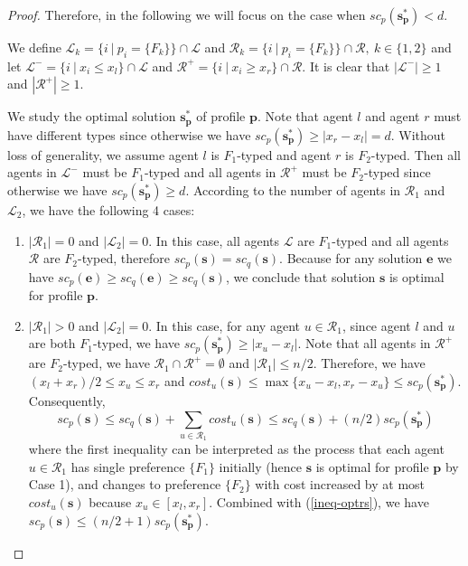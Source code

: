 \documentclass[twoside,11pt]{article}
\newcommand{\bd}{\mathbf}
\begin{document}
\begin{proof}
Therefore, in the following we will focus on the case when $sc_p (\bd{s_p^*}) < d$.

We define $\mathcal{L}_k = \{i~|~p_i = \{F_k\}\} \cap \mathcal{L}$ and $\mathcal{R}_k = \{i~|~p_i = \{F_k\}\} \cap \mathcal{R}, ~k \in \{1, 2\}$
and let $\mathcal{L}^{-} = \{i~|~x_i \leq x_l\}\cap \mathcal{L}$ and $\mathcal{R}^{+} = \{i~|~x_i \geq x_r\}\cap \mathcal{R}$.
It is clear that $|\mathcal{L}^-| \geq 1$ and $|\mathcal{R}^+| \geq 1$.

We study the optimal solution $\bd{s_p^*}$ of profile $\bd{p}$.
Note that agent $l$ and agent $r$ must have different types since otherwise we have $sc_p (\bd{s_p^*}) \ge |x_r - x_l| = d$.
Without loss of generality, we assume agent $l$ is $F_1$-typed and agent $r$ is $F_2$-typed.
Then all agents in $\mathcal{L}^-$ must be  $F_1$-typed and all agents in $\mathcal{R}^+$ must be $F_2$-typed since otherwise we have $sc_p (\bd{s_p^*}) \geq d$.
According to the number of agents in $\mathcal{R}_1$ and $\mathcal{L}_2$, we have the following 4 cases:
%
\begin{enumerate}%
\item %
$|\mathcal{R}_1| = 0$ and $|\mathcal{L}_2| = 0$.
%
In this case, all agents $\mathcal{L}$ are $F_1$-typed and all agents $\mathcal{R}$ are $F_2$-typed,
therefore $sc_p (\bd{s}) = sc_q(\bd{s})$.
Because for any solution $\bd{e}$ we have $sc_p(\bd{e}) \ge sc_q(\bd{e}) \ge sc_q(\bd{s})$, we conclude that solution $\bd{s}$ is  optimal for profile $\bd{p}$.
\item %
$|\mathcal{R}_1| > 0$ and $|\mathcal{L}_2| = 0$.
%
In this case, for any agent $u \in \mathcal{R}_1$, since agent $l$ and $u$ are both $F_1$-typed, we have $sc_p (\bd{s_p^*}) \geq |x_u-x_l|$.
Note that all agents in $\mathcal{R}^+$ are $F_2$-typed, we have $\mathcal{R}_1 \cap \mathcal{R}^+ = \emptyset$ and $|\mathcal{R}_1| \leq n/2$.
Therefore, we have $(x_l+x_r)/2 \le x_u \le x_r$ and $cost_u (\bd{s}) \le \max\{x_u-x_l,x_r-x_u\} \le sc_p (\bd{s_p^*})$.
Consequently,
$$sc_p (\bd{s}) \leq sc_q (\bd{s}) + \sum_{u \in \mathcal{R}_1} cost_u (\bd{s}) \leq sc_q (\bd{s}) + (n/2)sc_p (\bd{s_p^*})$$
where the first inequality can be interpreted as the process that each agent $u \in \mathcal{R}_1$ has single preference $\{F_1\}$ initially (hence $\bd{s}$ is optimal for profile $\bd{p}$ by Case 1), and changes to preference $\{F_2\}$ with cost increased by at most $cost_u (\bd{s})$ because $x_u \in [x_l, x_r]$.
Combined with (\ref{ineq-optrs}), we have $sc_p (\bd{s}) \leq (n/2+1) sc_p (\bd{s_p^*})$.


\end{enumerate}
\end{proof}
\end{document}
